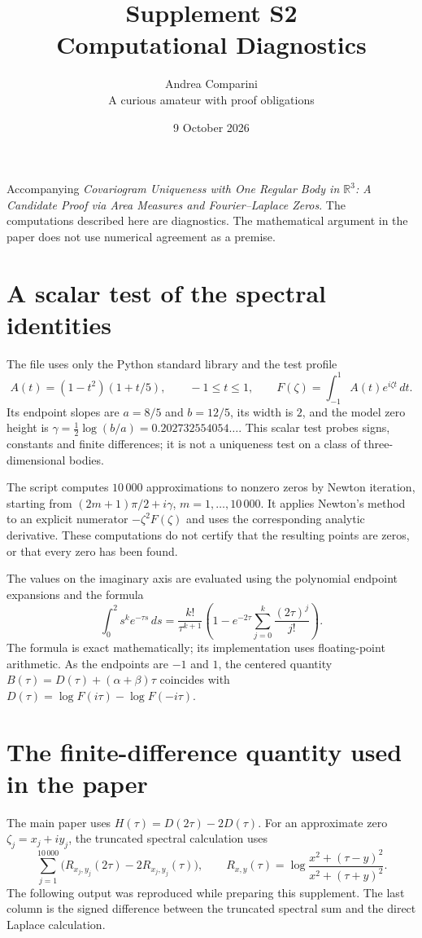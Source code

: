 \documentclass[11pt,a4paper]{article}
\title{Supplement S2\\Computational Diagnostics}
\author{Andrea Comparini\\\small A curious amateur with proof obligations}
\date{9 October 2026}
\begin{document}
\maketitle

\noindent Accompanying \emph{Covariogram Uniqueness with One Regular Body in
$\mathbb R^3$: A Candidate Proof via Area Measures and Fourier--Laplace Zeros}.
The computations described here are diagnostics. The mathematical argument
in the paper does not use numerical agreement as a premise.

\section{A scalar test of the spectral identities}
The file  uses only the Python standard
library and the test profile
\[
 A(t)=(1-t^2)(1+t/5),\qquad -1\le t\le1,
 \qquad F(\zeta)=\int_{-1}^1A(t)e^{i\zeta t}\,dt .
\]
Its endpoint slopes are $a=8/5$ and $b=12/5$, its width is $2$, and the
model zero height is
$\gamma=\tfrac12\log(b/a)=0.202732554054\ldots$.
This scalar test probes signs, constants and finite differences; it is
not a uniqueness test on a class of three-dimensional bodies.

The script computes $10\,000$ approximations to nonzero zeros by Newton
iteration, starting from $(2m+1)\pi/2+i\gamma$, $m=1,\ldots,10\,000$.
It applies Newton's method to an explicit numerator $-\zeta^2F(\zeta)$
and uses the corresponding analytic derivative. These computations do
not certify that the resulting points are zeros, or that every zero has
been found.

The values on the imaginary axis are evaluated using the polynomial
endpoint expansions and the formula
\[
 \int_0^2s^k e^{-\tau s}\,ds
 =\frac{k!}{\tau^{k+1}}
   \left(1-e^{-2\tau}\sum_{j=0}^k\frac{(2\tau)^j}{j!}\right).
\]
The formula is exact mathematically; its implementation uses floating-point
arithmetic. As the endpoints are $-1$ and $1$, the centered quantity
$B(\tau)=D(\tau)+(\alpha+\beta)\tau$ coincides with
$D(\tau)=\log F(i\tau)-\log F(-i\tau)$.

\section{The finite-difference quantity used in the paper}
The main paper uses $H(\tau)=D(2\tau)-2D(\tau)$.
For an approximate zero $\zeta_j=x_j+iy_j$, the truncated spectral
calculation uses
\[
 \sum_{j=1}^{10\,000}
 \bigl(R_{x_j,y_j}(2\tau)-2R_{x_j,y_j}(\tau)\bigr),\qquad
 R_{x,y}(\tau)=\log\frac{x^2+(\tau-y)^2}{x^2+(\tau+y)^2}.
\]
The following output was reproduced while preparing this supplement.
The last column is the signed difference between the truncated spectral
sum and the direct Laplace calculation.
\end{document}

